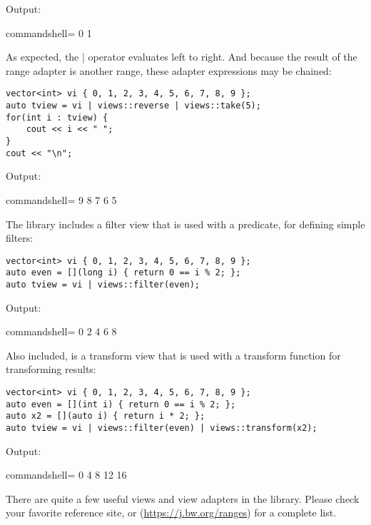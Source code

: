 Output:

\begin{tcblisting}{commandshell={}}
0 1
\end{tcblisting}

As expected, the | operator evaluates left to right. And because the result of the range adapter is another range, these adapter expressions may be chained:

\begin{lstlisting}[style=styleCXX]
vector<int> vi { 0, 1, 2, 3, 4, 5, 6, 7, 8, 9 };
auto tview = vi | views::reverse | views::take(5);
for(int i : tview) {
	cout << i << " ";
}
cout << "\n";
\end{lstlisting}

Output:

\begin{tcblisting}{commandshell={}}
9 8 7 6 5
\end{tcblisting}

The library includes a filter view that is used with a predicate, for defining simple filters:

\begin{lstlisting}[style=styleCXX]
vector<int> vi { 0, 1, 2, 3, 4, 5, 6, 7, 8, 9 };
auto even = [](long i) { return 0 == i % 2; };
auto tview = vi | views::filter(even);
\end{lstlisting}

Output:

\begin{tcblisting}{commandshell={}}
0 2 4 6 8
\end{tcblisting}

Also included, is a transform view that is used with a transform function for transforming results:

\begin{lstlisting}[style=styleCXX]
vector<int> vi { 0, 1, 2, 3, 4, 5, 6, 7, 8, 9 };
auto even = [](int i) { return 0 == i % 2; };
auto x2 = [](auto i) { return i * 2; };
auto tview = vi | views::filter(even) | views::transform(x2);
\end{lstlisting}

Output:

\begin{tcblisting}{commandshell={}}
0 4 8 12 16
\end{tcblisting}

There are quite a few useful views and view adapters in the library. Please check your favorite reference site, or (\url{https://j.bw.org/ranges}) for a complete list.

